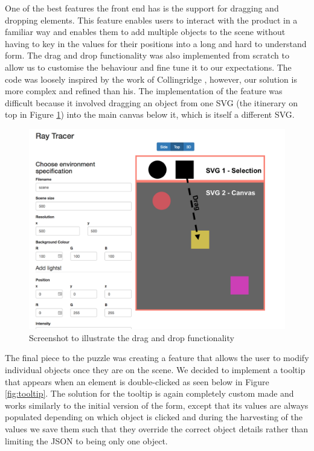\documentclass[a4paper]{report}
\begin{document}
	
	\par One of the best features the front end has is the support for dragging and dropping elements. This feature enables users to interact with the product in a familiar way and enables them to add multiple objects to the scene without having to key in the values for their positions into a long and hard to understand form. The drag and drop functionality was also implemented from scratch to allow us to customise the behaviour and fine tune it to our expectations. The code was loosely inspired by the work of Collingridge \cite{collingridge_draggable_2011}, however, our solution is more complex and refined than his. The implementation of the feature was difficult because it involved dragging an object from one SVG (the itinerary on top in Figure \ref{fig:drag_drop}) into the main canvas below it, which is itself a different SVG. \newline
	
	\begin{figure}[ht!]
		\centering
		\includegraphics[scale=0.30]{drag.png}
		\caption{Screenshot to illustrate the drag and drop functionality}
		\label{fig:drag_drop}
	\end{figure}
	
	
	\par The final piece to the puzzle was creating a feature that allows the user to modify individual objects once they are on the scene. We decided to implement a tooltip that appears when an element is double-clicked as seen below in Figure \ref{fig:tooltip}. The solution for the tooltip is again completely custom made and works similarly to the initial version of the form, except that its values are always populated depending on which object is clicked and during the harvesting of the values we save them such that they override the correct object details rather than limiting the JSON to being only one object.
	
\end{document}
